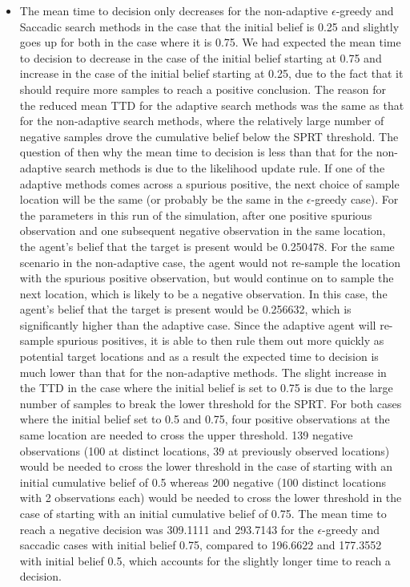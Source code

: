 \begin{itemize}
    \item The mean time to decision only decreases for the non-adaptive $\epsilon$-greedy and Saccadic search methods in the case that the initial belief is 0.25 and slightly goes up for both in the case where it is 0.75. We had expected the mean time to decision to decrease in the case of the initial belief starting at 0.75 and increase in the case of the initial belief starting at 0.25, due to the fact that it should require more samples to reach a positive conclusion. The reason for the reduced mean TTD for the adaptive search methods was the same as that for the non-adaptive search methods, where the relatively large number of negative samples drove the cumulative belief below the SPRT threshold. The question of then why the mean time to decision is less than that for the non-adaptive search methods is due to the likelihood update rule. If one of the adaptive methods comes across a spurious positive, the next choice of sample location will be the same (or probably be the same in the $\epsilon$-greedy case). For the parameters in this run of the simulation, after one positive spurious observation and one subsequent negative observation in the same location, the agent's belief that the target is present would be 0.250478. For the same scenario in the non-adaptive case, the agent would not re-sample the location with the spurious positive observation, but would continue on to sample the next location, which is likely to be a negative observation. In this case, the agent's belief that the target is present would be 0.256632, which is significantly higher than the adaptive case. Since the adaptive agent will re-sample spurious positives, it is able to then rule them out more quickly as potential target locations and as a result the expected time to decision is much lower than that for the non-adaptive methods. The slight increase in the TTD in the case where the initial belief is set to 0.75 is due to the large number of samples to break the lower threshold for the SPRT. For both cases where the initial belief set to 0.5 and 0.75, four positive observations at the same location are needed to cross the upper threshold. 139 negative observations (100 at distinct locations, 39 at previously observed locations) would be needed to cross the lower threshold in the case of starting with an initial cumulative belief of 0.5 whereas 200 negative (100 distinct locations with 2 observations each) would be needed to cross the lower threshold in the case of starting with an initial cumulative belief of 0.75. The mean time to reach a negative decision was 309.1111 and 293.7143 for the $\epsilon$-greedy and saccadic cases with initial belief 0.75, compared to 196.6622 and 177.3552 with initial belief 0.5, which accounts for the slightly longer time to reach a decision.
\end{itemize}



